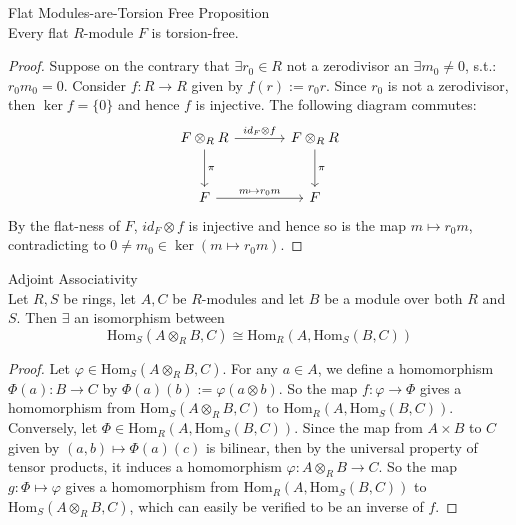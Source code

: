 \begin{proposition}{Flat Modules-are-Torsion Free Proposition}\\
Every flat $R$-module $F$ is torsion-free.
\end{proposition}

\begin{proof}
    Suppose on the contrary that $\exists{r_0} \in R$ not a zerodivisor an $\exists m_0 \neq 0$, s.t.: $r_0m_0 =0$. Consider $f: R\to R$ given by $f(r) := r_0r$. Since $r_0$ is not a zerodivisor, then $\ker f=\{0\}$ and hence $f$ is injective. The following diagram commutes:
    \[
    \begin{tikzcd}[row sep=large, column sep=large]
        F \otimes_R R \arrow[r, "id_F \otimes f"] \arrow[d, "\pi"]& F\otimes_R R \arrow[d, "\pi"]\\
        F \arrow[r, "m \mapsto r_0 m"] &F
    \end{tikzcd}
    \]
    By the flat-ness of $F$, $id_F \otimes f$ is injective and hence so is the map $m \mapsto r_0m$, contradicting to $0 \neq m_0 \in \ker (m \mapsto r_0m)$.
\end{proof}

\begin{theorem}{Adjoint Associativity}\\
Let $R,S$ be rings, let $A,C$ be $R$-modules and let $B$ be a module over both $R$ and $S$. Then $\exists$ an isomorphism between
\[
\text{Hom}_S (A \otimes_R B,C) \cong \text{Hom}_R (A, \text{Hom}_S (B,C))
\]
\end{theorem}

\begin{proof}
    Let $\varphi \in \text{Hom}_S (A \otimes_R B,C)$. For any $a \in A$, we define a homomorphism $\Phi (a): B \to C$ by $\Phi(a) (b) := \varphi (a \otimes b)$. So the map $f: \varphi \to \Phi$ gives a homomorphism from $\text{Hom}_S (A \otimes_R B,C)$ to $\text{Hom}_R (A, \text{Hom}_S (B,C))$. Conversely, let $\Phi \in \text{Hom}_R (A, \text{Hom}_S (B,C))$. Since the map from $A\times B$ to $C$ given by $(a,b) \mapsto \Phi(a) (c)$ is bilinear, then by the universal property of tensor products, it induces a homomorphism $\varphi: A \otimes_R B\to C$. So the map $g: \Phi \mapsto \varphi$ gives a homomorphism from $\text{Hom}_R(A, \text{Hom}_S (B,C))$ to $\text{Hom}_S(A \otimes _RB, C)$, which can easily be verified to be an inverse of $f$.
\end{proof}